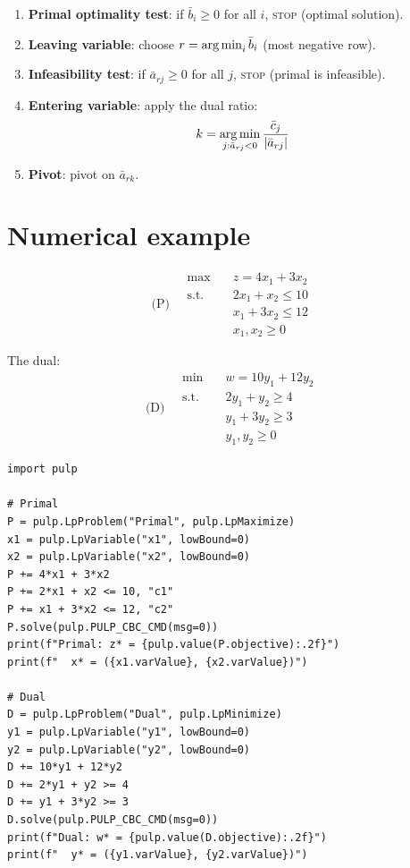 \begin{algorithme}[title=\textbf{Dual simplex --- one iteration}]
\begin{enumerate}
  \item \textbf{Primal optimality test}: if $\bar{b}_i \ge 0$ for all $i$,
        \textsc{stop} (optimal solution).
  \item \textbf{Leaving variable}: choose $r = \operatorname*{arg\,min}_i \bar{b}_i$ (most
        negative row).
  \item \textbf{Infeasibility test}: if $\bar{a}_{rj} \ge 0$ for all $j$,
        \textsc{stop} (primal is infeasible).
  \item \textbf{Entering variable}: apply the dual ratio:
        \[
          k = \operatorname*{arg\,min}_{j : \bar{a}_{rj} < 0}
            \frac{\bar{c}_j}{\left| \bar{a}_{rj} \right|}
        \]
  \item \textbf{Pivot}: pivot on $\bar{a}_{rk}$.
\end{enumerate}
\end{algorithme}

\section{Numerical example}

\begin{example}
\[
\text{(P)} \quad
\begin{aligned}
  \max \quad & z = 4x_1 + 3x_2 \\
  \text{s.t.} \quad
    & 2x_1 + x_2 \le 10 \\
    & x_1 + 3x_2 \le 12 \\
    & x_1, x_2 \ge 0
\end{aligned}
\]

The dual:
\[
\text{(D)} \quad
\begin{aligned}
  \min \quad & w = 10y_1 + 12y_2 \\
  \text{s.t.} \quad
    & 2y_1 + y_2 \ge 4 \\
    & y_1 + 3y_2 \ge 3 \\
    & y_1, y_2 \ge 0
\end{aligned}
\]
\end{example}

\begin{codeblock}[title=\textbf{Verification with PuLP}]
\begin{verbatim}
import pulp

# Primal
P = pulp.LpProblem("Primal", pulp.LpMaximize)
x1 = pulp.LpVariable("x1", lowBound=0)
x2 = pulp.LpVariable("x2", lowBound=0)
P += 4*x1 + 3*x2
P += 2*x1 + x2 <= 10, "c1"
P += x1 + 3*x2 <= 12, "c2"
P.solve(pulp.PULP_CBC_CMD(msg=0))
print(f"Primal: z* = {pulp.value(P.objective):.2f}")
print(f"  x* = ({x1.varValue}, {x2.varValue})")

# Dual
D = pulp.LpProblem("Dual", pulp.LpMinimize)
y1 = pulp.LpVariable("y1", lowBound=0)
y2 = pulp.LpVariable("y2", lowBound=0)
D += 10*y1 + 12*y2
D += 2*y1 + y2 >= 4
D += y1 + 3*y2 >= 3
D.solve(pulp.PULP_CBC_CMD(msg=0))
print(f"Dual: w* = {pulp.value(D.objective):.2f}")
print(f"  y* = ({y1.varValue}, {y2.varValue})")
\end{verbatim}
\end{codeblock}

